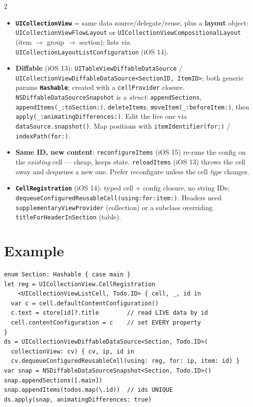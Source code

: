 \documentclass[8pt]{extarticle}
\begin{document}
\begin{multicols}{2}
\begin{itemize}
  \item \textbf{\texttt{UICollectionView}} = same data source/delegate/reuse, plus a \textbf{layout}
        object: \texttt{UICollectionViewFlowLayout} or \texttt{UICollectionViewCompositionalLayout}
        (item $\to$ group $\to$ section); lists via \texttt{UICollectionLayoutListConfiguration} (iOS 14).
  \item \textbf{Diffable} (iOS 13): \texttt{UITableViewDiffableDataSource} /
        \texttt{UICollectionViewDiffableDataSource<SectionID, ItemID>}; both generic params
        \textbf{\texttt{Hashable}}; created with a \texttt{cellProvider} closure.
        \texttt{NSDiffableDataSourceSnapshot} is a \emph{struct}: \texttt{appendSections},
        \texttt{appendItems(\_:toSection:)}, \texttt{deleteItems}, \texttt{moveItem(\_:beforeItem:)},
        then \texttt{apply(\_:animatingDifferences:)}. Edit the live one via
        \texttt{dataSource.snapshot()}. Map positions with \texttt{itemIdentifier(for:)} /
        \texttt{indexPath(for:)}.
  \item \textbf{Same ID, new content}: \texttt{reconfigureItems} (iOS 15) re-runs the config on the
        \emph{existing} cell — cheap, keeps state. \texttt{reloadItems} (iOS 13) throws the cell away
        and dequeues a new one. Prefer reconfigure unless the cell \emph{type} changes.
  \item \textbf{\texttt{CellRegistration}} (iOS 14): typed cell + config closure, no string IDs;
        \texttt{dequeueConfiguredReusableCell(using:for:item:)}. Headers need
        \texttt{supplementaryViewProvider} (collection) or a subclass overriding
        \texttt{titleForHeaderInSection} (table).
\end{itemize}

\section{Example}
\begin{lstlisting}[language=SwiftSheet]
enum Section: Hashable { case main }
let reg = UICollectionView.CellRegistration
    <UICollectionViewListCell, Todo.ID> { cell, _, id in
  var c = cell.defaultContentConfiguration()
  c.text = store[id]?.title        // read LIVE data by id
  cell.contentConfiguration = c    // set EVERY property
}
ds = UICollectionViewDiffableDataSource<Section, Todo.ID>(
  collectionView: cv) { cv, ip, id in
  cv.dequeueConfiguredReusableCell(using: reg, for: ip, item: id) }
var snap = NSDiffableDataSourceSnapshot<Section, Todo.ID>()
snap.appendSections([.main])
snap.appendItems(todos.map(\.id))  // ids UNIQUE
ds.apply(snap, animatingDifferences: true)
\end{lstlisting}


\end{multicols}
\end{document}
